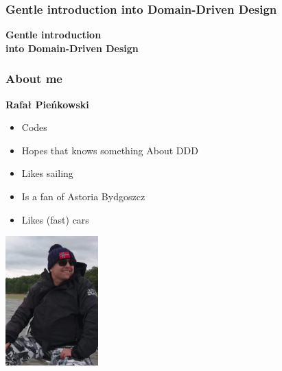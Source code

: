 \documentclass{beamer}
\newcommand{\slideTitle}
{
	\frametitle{
		\small{
			\textbf{Gentle introduction into Domain-Driven Design}
			}
		}
}
\begin{document}
\centering


\begin{frame}
\slideTitle

\textbf{
	\Huge{
        Gentle introduction \\ into 
    }
    \vskip 5mm
    \Huge{Domain-Driven Design}
}

\end{frame}


\begin{frame}
\frametitle{\textbf{About me}}

\begin{minipage}{0.45\textwidth}
\begin{center}
    \textbf{
        \Large{ Rafał Pieńkowski }
    }
    \begin{itemize}
        \item Codes
        \item Hopes that knows something About DDD
        \vskip 3mm
        \item Likes sailing
        \item Is a fan of Astoria Bydgoszcz
        \item Likes (fast) cars
    \end{itemize}	
\end{center}
\end{minipage}
\begin{minipage}{0.45\textwidth}
    \hspace{15mm}
    \includegraphics[height=5cm]{me.png}
\end{minipage}

\end{frame}

\end{document}
